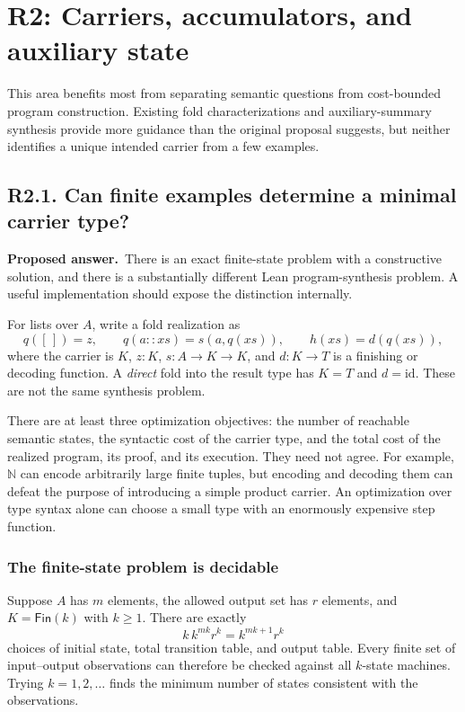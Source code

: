 \documentclass[11pt,a4paper]{article}
\newcommand{\Nat}{\mathbb{N}}
\newcommand{\Fin}{\mathsf{Fin}}
\newcommand{\nil}{[\,]}
\newcommand{\cons}{\mathbin{::}}
\newcommand{\question}[2]{\subsection{#1. #2}\label{q:#1}}
\newcommand{\answer}{\textbf{Proposed answer.}\ }
\theoremstyle{remark}
\begin{document}
\section{R2: Carriers, accumulators, and auxiliary state}
\label{sec:r2}

This area benefits most from separating semantic questions from cost-bounded
program construction. Existing fold characterizations and auxiliary-summary
synthesis provide more guidance than the original proposal suggests, but
neither identifies a unique intended carrier from a few examples.

\question{R2.1}{Can finite examples determine a minimal carrier type?}

\answer There is an exact finite-state problem with a constructive solution,
and there is a substantially different Lean program-synthesis problem. A
useful implementation should expose the distinction internally.

For lists over $A$, write a fold realization as
\begin{equation}\label{eq:fold-realization}
 q(\nil)=z,\qquad q(a\cons xs)=s(a,q(xs)),\qquad h(xs)=d(q(xs)),
\end{equation}
where the carrier is $K$, $z:K$, $s:A\to K\to K$, and $d:K\to T$ is a
finishing or decoding function. A \emph{direct} fold into the result type has
$K=T$ and $d=\mathrm{id}$. These are not the same synthesis problem.

There are at least three optimization objectives: the number of reachable
semantic states, the syntactic cost of the carrier type, and the total cost
of the realized program, its proof, and its execution. They need not agree.
For example, $\Nat$ can encode arbitrarily large finite tuples, but encoding
and decoding them can defeat the purpose of introducing a simple product
carrier. An optimization over type syntax alone can choose a small type with
an enormously expensive step function.

\subsubsection*{The finite-state problem is decidable}

Suppose $A$ has $m$ elements, the allowed output set has $r$ elements, and
$K=\Fin(k)$ with $k\geq1$. There are exactly
\begin{equation}\label{eq:machine-count}
 k\,k^{mk}r^k=k^{mk+1}r^k
\end{equation}
choices of initial state, total transition table, and output table. Every
finite set of input--output observations can therefore be checked against
all $k$-state machines. Trying $k=1,2,\ldots$ finds the minimum number of
states consistent with the observations.
\end{document}
